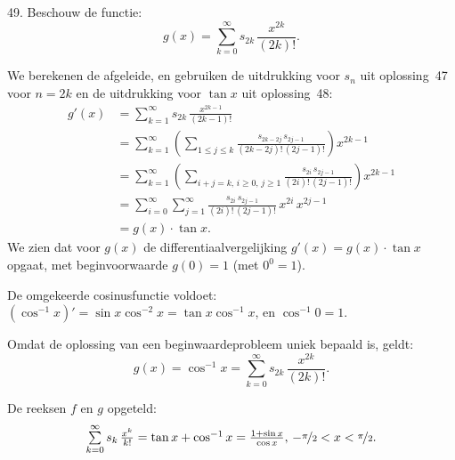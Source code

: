 \begin{problem}{49.}
	Beschouw de functie:
	\begin{equation*}
		g(x) = \textstyle\sum\limits_{k=0}^{\infty} s_{2k}\, \frac{x^{2k}}{(2k)!}.
	\end{equation*}

    We berekenen de afgeleide, en gebruiken de uitdrukking voor $s_n$ uit oplossing~47 voor $n = 2k$ en de uitdrukking voor $\tan x$ uit oplossing~48:
    \begin{equation*}
    \begin{split}
        g'(x) & = \textstyle\sum\limits_{k=1}^{\infty} s_{2k}\, \frac{x^{2k - 1}}{(2k - 1)!} \\
              & = \textstyle\sum\limits_{k=1}^{\infty} \left( \textstyle\sum\limits_{1 \leq j \leq k} \frac{s_{2k - 2j}\, s_{2j - 1}}{(2k - 2j)!\, (2j - 1)!} \right) x^{2k - 1} \\
              & = \textstyle\sum\limits_{k=1}^{\infty} \left( \textstyle\sum\limits_{i+j=k,\, i \geq 0,\, j\geq 1} \frac{s_{2i}\, s_{2j - 1}}{(2i)!\, (2j - 1)!} \right) x^{2k - 1} \\
              & = \textstyle\sum\limits_{i=0}^{\infty} \textstyle\sum\limits_{j=1}^{\infty} \frac{s_{2i}\, s_{2j - 1}}{(2i)!\, (2j - 1)!} \, x^{2i}\, x^{2j - 1} \\
              & = g(x) \cdot \tan x.
    \end{split}
	\end{equation*}
    We zien dat voor $g(x)$ de differentiaalvergelijking $g'(x) = g(x) \cdot \tan x$ opgaat, met beginvoorwaarde $g(0) = 1$ (met $0^0 = 1$).

    De omgekeerde cosinusfunctie voldoet: $(\cos^{-1} x)' = \sin x \cos^{-2} x = \tan x \cos^{-1} x$, en $\cos^{-1} 0 = 1$.

    Omdat de oplossing van een beginwaardeprobleem uniek bepaald is, geldt:
    \begin{equation*}
		g(x) = \cos^{-1} x = \textstyle\sum\limits_{k=0}^{\infty} s_{2k}\, \frac{x^{2k}}{(2k)!}.
	\end{equation*}

    De reeksen $f$ en $g$ opgeteld:
    \begin{equation*}
		\textstyle\sum\limits_{k=0}^{\infty} s_{k}\, \frac{x^k}{k!} = \tan x + \cos^{-1} x = \frac{1 + \sin x}{\cos x},\, -\nicefrac{\pi}{2} < x < \nicefrac{\pi}{2}.
	\end{equation*}
\end{problem}

